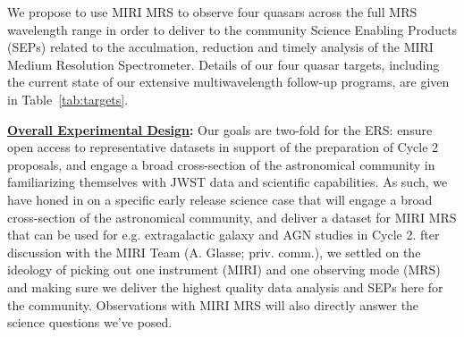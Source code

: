 \smallskip \smallskip
\noindent
We propose to use MIRI MRS to observe four quasars across the full MRS
wavelength range in order to deliver to the community Science Enabling
Products (SEPs) related to the acculmation, reduction and timely
analysis of the MIRI Medium Resolution Spectrometer. Details of our
four quasar targets, including the current state of our extensive
multiwavelength follow-up programs, are given in
Table~\ref{tab:targets}.


\smallskip \smallskip
\smallskip \smallskip
\noindent
{\bf \underline{Overall Experimental Design}:} 
Our goals are two-fold for the ERS: ensure open access to
representative datasets in support of the preparation of Cycle 2
proposals, and engage a broad cross-section of the astronomical
community in familiarizing themselves with JWST data and scientific
capabilities.  As such, we have honed in on a specific early release
science case that will engage a broad cross-section of the
astronomical community, and deliver a dataset for MIRI MRS that can be
used for e.g. extragalactic galaxy and AGN studies in Cycle 2.  fter
discussion with the MIRI Team (A. Glasse; priv. comm.), we settled on
the ideology of picking out one instrument (MIRI) and one observing
mode (MRS) and making sure we deliver the highest quality data
analysis and SEPs here for the community. Observations with MIRI MRS
will also directly answer the science questions we've posed.



